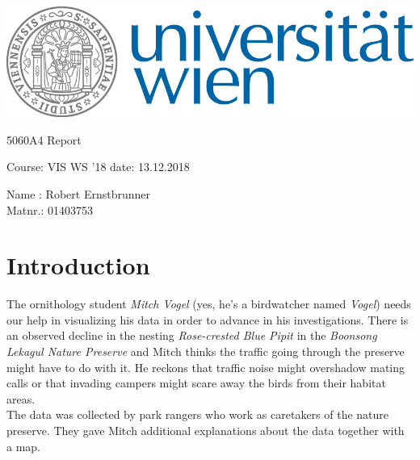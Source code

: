 \documentclass{article}
\makeatletter
\newcommand\HUGE{\@setfontsize\Huge{50}{60}}
\makeatother
\begin{document}

 
\thispagestyle{empty}
\begin{center}
\begin{minipage}{.9\linewidth}
\flushright
	      		 
\includegraphics[width=0.5\linewidth]{univie.jpg}\par
\vspace{1.5cm}
\centering 	
	{\scshape{\HUGE A4 Report \par}}
	\vspace{1cm}
    {\scshape{\Large Course: VIS WS '18 \qquad  date: 13.12.2018\par}}
	\vspace{1cm}

 {\Large Name : Robert Ernstbrunner \\ Matnr.: 01403753 \hspace{2.2cm} \ \par}
 	\vspace{.7cm}

 

\end{minipage}
\end{center}
\clearpage

\section{Introduction}

The ornithology student \textit{Mitch Vogel} (yes, he's a birdwatcher named \textit{Vogel}) needs our help in visualizing his data in order to advance in his investigations. There is an observed decline in the nesting \textit{Rose-crested Blue Pipit} in the \textit{Boonsong Lekagul Nature Preserve} and Mitch thinks the traffic going through the preserve might have to do with it.
He reckons that traffic noise might overshadow mating calls or that invading campers might scare away the birds from their habitat areas. \\
The data was collected by park rangers who work as caretakers of the nature preserve. They gave Mitch additional explanations about the data together with a map. 
\end{document}
